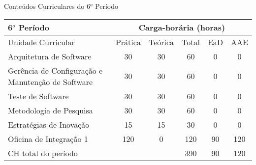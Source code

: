 \begin{quadro}[ht!]
\centering
\caption{Conteúdos Curriculares do 6$^o$ Período}\label{qua:periodo6}
\begin{tabular}{|p{8.0cm}|c|c|c|c|c|}
\hline
\rowcolor{blue1} 6$^o$ Período & \multicolumn{5}{|c|}{\centering Carga-horária (horas)} \\ \hline
\rowcolor{blue1} Unidade Curricular & Prática & Teórica & Total & EaD & AAE \\ \hline
Arquitetura de Software & 30 & 30 & 60 & 0	&	0 \\	\hline
Gerência de Configuração e Manutenção de Software & 30 & 30 & 60 & 0	&	0 \\	\hline
Teste de Software  & 30 & 30 & 60 & 0	&	0 \\	\hline
Metodologia de Pesquisa & 30 & 30 & 60 & 0	&	0 \\	\hline
Estratégias de Inovação & 15 & 15 & 30 & 0	&	0 \\	\hline
Oficina de Integração 1 & 120 & 0 & 120 & 90	&	120 \\	\hline
CH total do período & \multicolumn{2}{p{3.3cm}|}{\cellcolor{blue1}} & 390 & 90	&	120 \\ \hline
\end{tabular} \end{quadro}